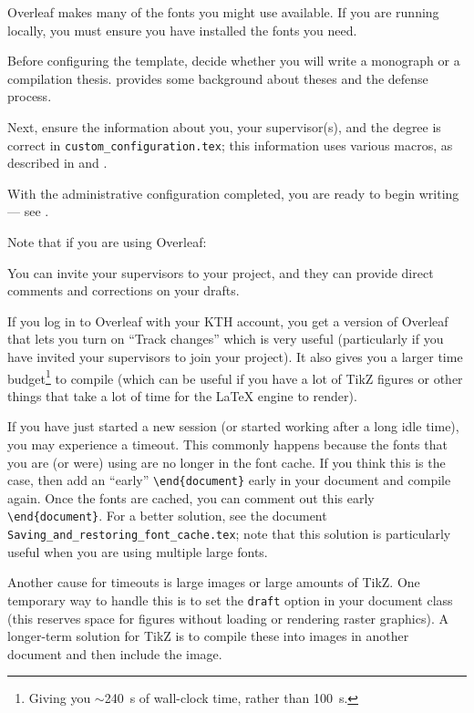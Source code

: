 \documentclass[12pt, twoside]{article}
\newcommand{\fname}[1]{\texttt{#1}}
\begin{document}
Overleaf makes many of the fonts you might use available. If you are running locally, you must ensure you have installed the fonts you need.

Before configuring the template, decide whether you will write a monograph or a compilation thesis.  provides some background about theses and the defense process.

Next, ensure the information about you, your supervisor(s), and the degree is correct in \fname{custom\_configuration.tex}; this information uses various macros, as described in  and . 

With the administrative configuration completed, you are ready to begin writing --- see .

Note that if you are using Overleaf:
\begin{description}[style=nextline, labelwidth=\widthof{\textbf{Timeouts}}, leftmargin=!]
\item[Invite your supervisors to your project] 
    You can invite your supervisors to your project, and they can provide direct comments and corrections on your drafts.
    
\item[Log in to Overleaf with your \gls{KTH} account] 
If you log in to Overleaf with your \gls{KTH} account, you get a version of Overleaf that lets you turn on \enquote{Track changes} which is very useful (particularly if you have invited your supervisors to join your project). It also gives you a larger time budget\footnote{Giving you $\sim$\qty{240}{\second} of wall-clock time, rather than \qty{100}{\second}.} to compile (which can be useful if you have a lot of TikZ figures or other things that take a lot of time for the \LaTeX{} engine to render).

\item[Timeouts] If you have just started a new session (or started working after a long idle time), you may experience a timeout. This commonly happens because the fonts that you are (or were) using are no longer in the font cache. If you think this is the case, then add an \enquote{early} \texttt{\textbackslash end\{document\}} early in your document and compile again. Once the fonts are cached, you can comment out this early \texttt{\textbackslash end\{document\}}. For a better solution, see the document \fname{Saving\_and\_restoring\_font\_cache.tex}; note that this solution is particularly useful when you are using multiple large fonts.

Another cause for timeouts is large images or large amounts of TikZ. One temporary way to handle this is to set the \texttt{draft} option in your document class (this reserves space for figures without loading or rendering raster graphics). A longer-term solution for TikZ is to compile these into images in another document and then include the image.
\end{description}
\end{document}
